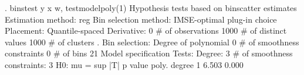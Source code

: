 . binstest y x w, testmodelpoly(1)
{\smallskip}
Hypothesis tests based on binscatter estimates
Estimation method: reg
Bin selection method: IMSE-optimal plug-in choice
Placement: Quantile-spaced
Derivative: 0
{\smallskip}
\# of observations             {\VBAR}    1000
\# of distinct values          {\VBAR}    1000
\# of clusters                 {\VBAR}       .
Bin selection:                {\VBAR} 
         Degree of polynomial {\VBAR}       0
  \# of smoothness constraints {\VBAR}       0
                    \# of bins {\VBAR}      21
{\smallskip}
Model specification Tests:
Degree: 3     \# of smoothness constraints: 3
{\smallskip}
H0: mu =           {\VBAR} sup |T|           p value
poly. degree  1    {\VBAR}   6.503             0.000

